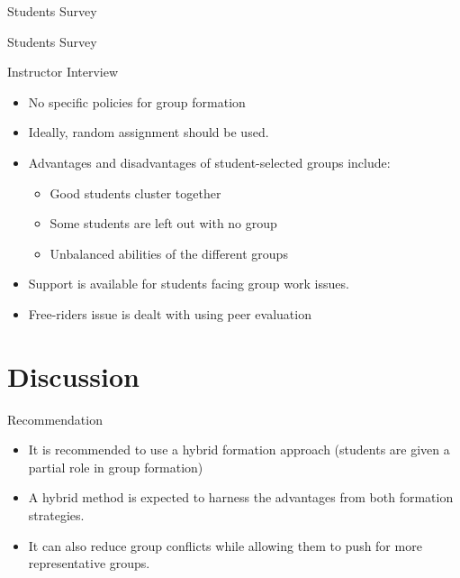 \documentclass[12pt,table]{beamer}
\begin{document}
\begin{frame}{Students Survey}
    
\end{frame}

\begin{frame}{Students Survey}
    
\end{frame}


\begin{frame}{Instructor Interview}
\begin{itemize}
        \item No specific policies for group formation
        \item Ideally, random assignment should be used.
        \item Advantages and disadvantages of student-selected groups include:
        \begin{itemize}
            \item {\color{green!50!black}Good students cluster together}
            \item {\color{red}Some students are left out with no group}
            \item {\color{red}Unbalanced abilities of the different groups}
        \end{itemize}
        \item Support is available for students facing group work issues.
        \item Free-riders issue is dealt with using peer evaluation
    \end{itemize}
\end{frame}

\section{Discussion}

\begin{frame}{Recommendation}
\begin{itemize}
    \item It is recommended to use a hybrid formation approach (students are given a partial role in group formation)
    \item A hybrid method is expected to harness the advantages from both formation strategies.
    \item It can also reduce group conflicts while allowing them to push for more representative groups.
\end{itemize}
\end{frame}
\end{document}

